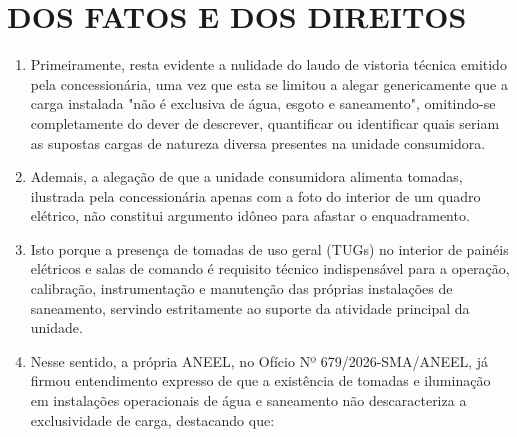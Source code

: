 \newcommand{\tipoRequerimento}{cobrança indevida sobre enquadramento tarifário incorreto}
\newcommand{\tese}{}

\section{DOS FATOS E DOS DIREITOS}

\begin{enumerate}[resume]
    \item Primeiramente, resta evidente a nulidade do laudo de vistoria técnica emitido pela concessionária, uma vez que esta se limitou a alegar genericamente que a carga instalada "não é exclusiva de água, esgoto e saneamento", omitindo-se completamente do dever de descrever, quantificar ou identificar quais seriam as supostas cargas de natureza diversa presentes na unidade consumidora.

    \item Ademais, a alegação de que a unidade consumidora alimenta tomadas, ilustrada pela concessionária apenas com a foto do interior de um quadro elétrico, não constitui argumento idôneo para afastar o enquadramento.

    \item Isto porque a presença de tomadas de uso geral (TUGs) no interior de painéis elétricos e salas de comando é requisito técnico indispensável para a operação, calibração, instrumentação e manutenção das próprias instalações de saneamento, servindo estritamente ao suporte da atividade principal da unidade.  

    \item Nesse sentido, a própria ANEEL, no Ofício Nº 679/2026-SMA/ANEEL, já firmou entendimento expresso de que a existência de tomadas e iluminação em instalações operacionais de água e saneamento não descaracteriza a exclusividade de carga, destacando que:  
    
     


\end{enumerate}
